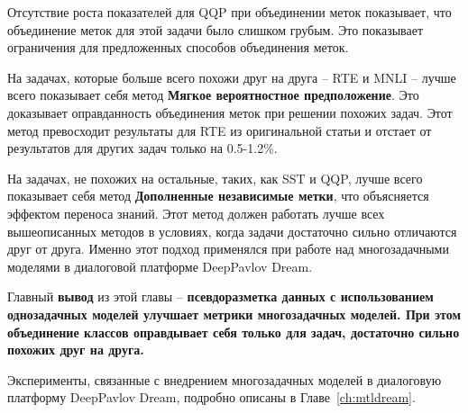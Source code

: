 Отсутствие роста показателей для QQP при объединении меток показывает, что объединение меток для этой задачи было слишком грубым. Это показывает ограничения для предложенных способов объединения меток.
 
На задачах, которые больше всего похожи друг на друга -- RTE и MNLI -- лучше всего показывает себя метод \textbf{Мягкое вероятностное предположение}. Это доказывает оправданность объединения меток при решении похожих задач. Этот метод превосходит результаты для RTE из оригинальной статьи и отстает от результатов для других задач только на 0.5-1.2\%.

На задачах, не похожих на остальные, таких, как SST и QQP, лучше всего показывает себя метод \textbf{Дополненные независимые метки}, что объясняется эффектом переноса знаний. Этот метод должен работать лучше всех вышеописанных методов в условиях, когда задачи достаточно сильно отличаются друг от друга. Именно этот подход применялся при работе над многозадачными моделями в диалоговой платформе DeepPavlov Dream.

Главный \textbf{вывод} из этой главы -- \textbf{псевдоразметка данных с использованием однозадачных моделей улучшает метрики многозадачных моделей. При этом объединение классов оправдывает себя только для задач, достаточно сильно похожих друг на друга.}

Эксперименты, связанные с внедрением многозадачных моделей в диалоговую платформу DeepPavlov Dream, подробно описаны в Главе~\ref{ch:mtldream}.
